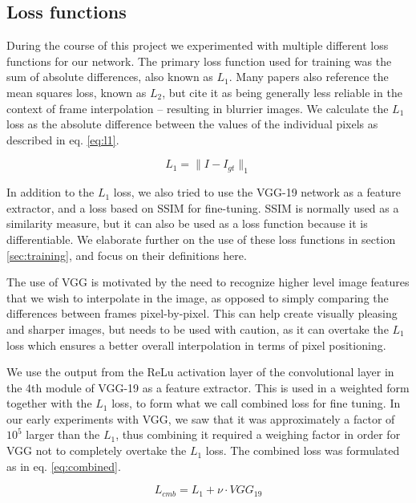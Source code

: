 \documentclass[10pt,twocolumn,letterpaper]{article}
\begin{document}

\subsection{Loss functions}
During the course of this project we experimented with multiple different loss functions for our network. The primary loss function used for training was the sum of absolute differences, also known as $L_1$. Many papers also reference the mean squares loss, known as $L_2$, but cite it as being generally less reliable in the context of frame interpolation -- resulting in blurrier images. We calculate the $L_1$ loss as the absolute difference between the values of the individual pixels as described in eq. \ref{eq:l1}.

\begin{equation}
L_1= \|I - I_{gt}\|_1
\label{eq:l1}
\end{equation}

In addition to the $L_1$ loss, we also tried to use the VGG-19 \cite{VGG} network as a feature extractor, and a loss based on SSIM for fine-tuning. SSIM is normally used as a similarity measure, but it can also be used as a loss function because it is differentiable. We elaborate further on the use of these loss functions in section \ref{sec:training}, and focus on their definitions here.

The use of VGG is motivated by the need to recognize higher level image features that we wish to interpolate in the image, as opposed to simply comparing the differences between frames pixel-by-pixel. This can help create visually pleasing and sharper images, but needs to be used with caution, as it can overtake the $L_1$ loss which ensures a better overall interpolation in terms of pixel positioning.

We use the output from the ReLu activation layer of the convolutional layer in the 4th module of VGG-19 as a feature extractor. This is used in a weighted form together with the $L_1$ loss, to form what we call combined loss for fine tuning. In our early experiments with VGG, we saw that it was approximately a factor of $10^5$ larger than the $L_1$, thus combining it required a weighing factor in order for VGG not to completely overtake the $L_1$ loss. The combined loss was formulated as in eq. \ref{eq:combined}.

\begin{equation}
L_{cmb}= L_1 + \nu \cdot VGG_{19}
\label{eq:combined}
\end{equation}
\end{document}
